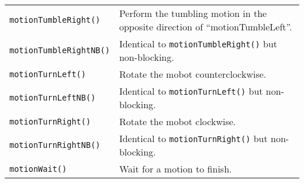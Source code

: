 \begin{table}[!h]
\begin{center}
\begin{tabular}{p{38 mm}p{107 mm}}
\texttt{motionTumbleRight()} \dotfill & Perform the tumbling motion in the opposite direction of ``motionTumbleLeft''. \\
\texttt{motionTumbleRightNB()} \dotfill & Identical to \texttt{motionTumbleRight()} but non-blocking. \\
\texttt{motionTurnLeft()} \dotfill & Rotate the mobot counterclockwise. \\
\texttt{motionTurnLeftNB()} \dotfill & Identical to \texttt{motionTurnLeft()} but non-blocking. \\
\texttt{motionTurnRight()} \dotfill & Rotate the mobot clockwise. \\
\texttt{motionTurnRightNB()} \dotfill & Identical to \texttt{motionTurnRight()} but non-blocking. \\
\texttt{motionWait()} \dotfill & Wait for a motion to finish. \\
\hline
\end{tabular}
\end{center}
\label{mobilec_api_compound}
\end{table}

\clearpage
\newpage











%









































%













